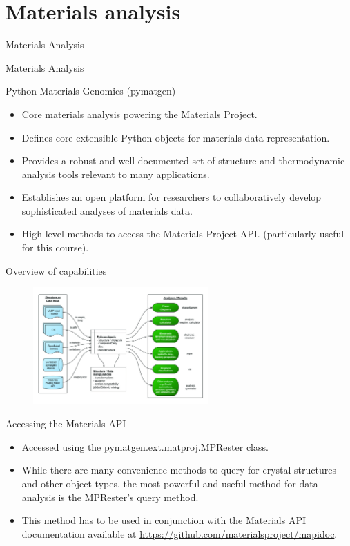 \documentclass[aspectratio=169]{beamer}
\begin{document}
\section{Materials analysis}

\begin{frame}{Materials Analysis}
    \Huge{\centerline{Materials Analysis}}
\end{frame} 

\begin{frame}{Python Materials Genomics (pymatgen)}
    \begin{itemize}
        \item Core materials analysis powering the Materials Project.\cite{ongPythonMaterialsGenomics2013}
        \item Defines core extensible Python objects for materials data representation.
        \item Provides a robust and well-documented set of structure and thermodynamic analysis tools relevant to many applications.
        \item Establishes an open platform for researchers to collaboratively develop sophisticated analyses of materials data.
        \item High-level methods to access the Materials Project API.\cite{ongMaterialsApplicationProgramming2015} (particularly useful for this course).
    \end{itemize}
\end{frame}


\begin{frame}{Overview of capabilities}
    \begin{figure}
        \centering
        \includegraphics[width=0.6\textwidth]{figures/pymatgen-overview.jpg}
    \end{figure}
\end{frame}


\begin{frame}[fragile]{Accessing the Materials API}
    \begin{itemize}
        \item Accessed using the pymatgen.ext.matproj.MPRester class.
        \item While there are many convenience methods to query for crystal structures and other object types, the most powerful and useful method for data analysis is the MPRester's query method.
        \item This method has to be used in conjunction with the Materials API documentation available at \url{https://github.com/materialsproject/mapidoc}.
\inputminted{python}{example_materials_api.py}
    \end{itemize}
\end{frame} 
\end{document}
